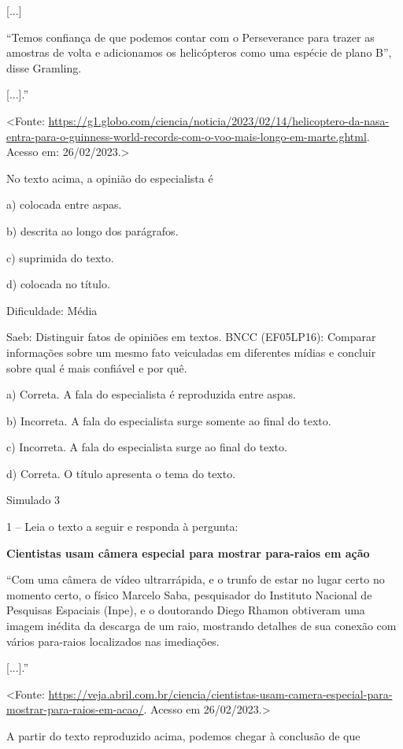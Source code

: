 {[}...{]}

``Temos confiança de que podemos contar com o Perseverance para trazer
as amostras de volta e adicionamos os helicópteros como uma espécie de
plano B'', disse Gramling.

{[}...{]}.''

\textless{}Fonte:
\url{https://g1.globo.com/ciencia/noticia/2023/02/14/helicoptero-da-nasa-entra-para-o-guinness-world-records-com-o-voo-mais-longo-em-marte.ghtml}.
Acesso em: 26/02/2023.\textgreater{}

No texto acima, a opinião do especialista é

a) colocada entre aspas.

b) descrita ao longo dos parágrafos.

c) suprimida do texto.

d) colocada no título.

Dificuldade: Média

Saeb: Distinguir fatos de opiniões em textos. BNCC (EF05LP16): Comparar
informações sobre um mesmo fato veiculadas em diferentes mídias e
concluir sobre qual é mais confiável e por quê.

a) Correta. A fala do especialista é reproduzida entre aspas.

b) Incorreta. A fala do especialista surge somente ao final do texto.

c) Incorreta. A fala do especialista surge ao final do texto.

d) Correta. O título apresenta o tema do texto.

Simulado 3

1 -- Leia o texto a seguir e responda à pergunta:

\textbf{Cientistas usam câmera especial para mostrar para-raios em ação}

``Com uma câmera de vídeo ultrarrápida, e o trunfo de estar no lugar
certo no momento certo, o físico Marcelo Saba, pesquisador do Instituto
Nacional de Pesquisas Espaciais (Inpe), e o doutorando Diego Rhamon
obtiveram uma imagem inédita da descarga de um raio, mostrando detalhes
de sua conexão com vários para-raios localizados nas imediações.

{[}...{]}.''

\textless{}Fonte:
\url{https://veja.abril.com.br/ciencia/cientistas-usam-camera-especial-para-mostrar-para-raios-em-acao/}.
Acesso em 26/02/2023.\textgreater{}

A partir do texto reproduzido acima, podemos chegar à conclusão de que

